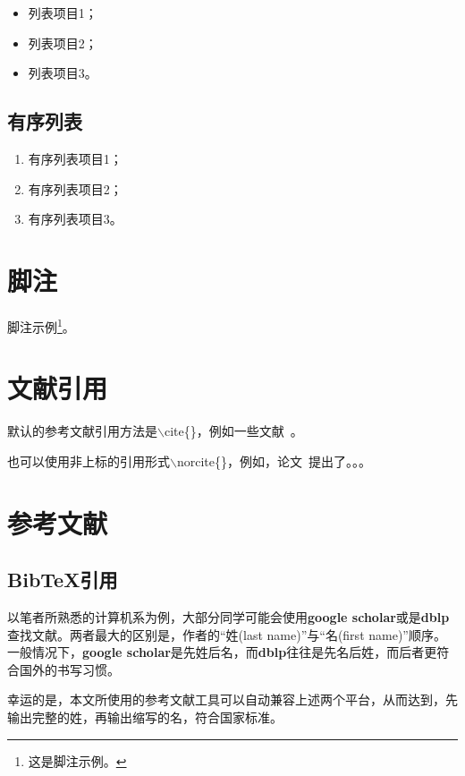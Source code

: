 \begin{itemize}
    \item 列表项目1；
    \item 列表项目2；
    \item 列表项目3。
\end{itemize}

\subsection{有序列表}

\begin{enumerate}
    \item 有序列表项目1；
    \item 有序列表项目2；
    \item 有序列表项目3。
\end{enumerate}


\section{脚注}

脚注示例\footnote{这是脚注示例。}。


\section{文献引用}

默认的参考文献引用方法是$\backslash$cite\{\}，例如一些文献~\cite{kearns1994introduction,shalev2014understanding}。

也可以使用非上标的引用形式$\backslash$norcite\{\}，例如，论文~提出了。。。


\section{参考文献}

\subsection{BibTeX引用}

以笔者所熟悉的计算机系为例，大部分同学可能会使用\textbf{google scholar}或是\textbf{dblp}查找文献。两者最大的区别是，作者的``姓(last name)''与``名(first name)''顺序。一般情况下，\textbf{google scholar}是先姓后名，而\textbf{dblp}往往是先名后姓，而后者更符合国外的书写习惯。

幸运的是，本文所使用的参考文献工具可以自动兼容上述两个平台，从而达到，先输出完整的姓，再输出缩写的名，符合国家标准。

